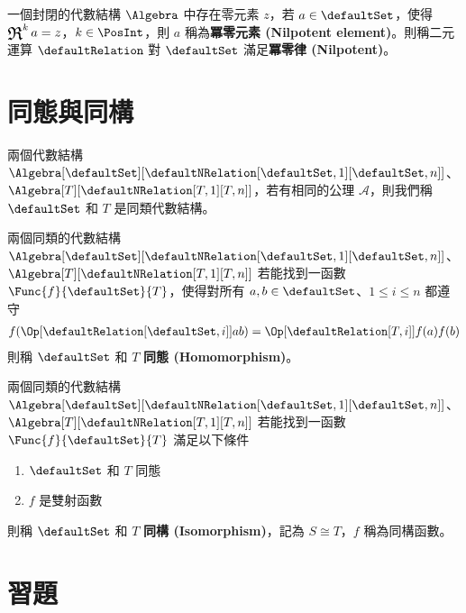 \documentclass[12pt,a4paper,oneside]{report}
\begin{document}
\begin{CJK}{UTF8}{bkai}
\begin{mydef}[冪零元素與冪零律]
\label{def:algebra:nilpotent}
一個封閉的代數結構 $\Algebra$ 中存在零元素 $z$，若 $a\in{\defaultSet}$，使得 $\opR^{k}{a}=z$，$k\in{\PosInt}$，則 $a$ 稱為\textbf{冪零元素 (Nilpotent element)}。則稱二元運算 $\defaultRelation$ 對 $\defaultSet$ 滿足\textbf{冪零律 (Nilpotent)}。
\end{mydef}

\section{同態與同構}

\begin{mydef}[代數結構分類]
兩個代數結構 $\Algebra[\defaultSet][{\defaultNRelation[\defaultSet,1][\defaultSet,n]}]$、$\Algebra[T][{\defaultNRelation[T,1][T,n]}]$，若有相同的公理 $\mathcal{A}$，則我們稱 $\defaultSet$ 和 $T$ 是同類代數結構。
\end{mydef}

\begin{mydef}[同態]
\label{def:algebra:homomorphism}
兩個同類的代數結構 $\Algebra[\defaultSet][{\defaultNRelation[\defaultSet,1][\defaultSet,n]}]$、$\Algebra[T][{\defaultNRelation[T,1][T,n]}]$ 若能找到一函數 $\Func{f}{\defaultSet}{T}$，使得對所有 $a,b\in{\defaultSet}$、$1\leq{i}\leq{n}$ 都遵守
\begin{align*}
{f(\Op[{\defaultRelation[\defaultSet,i]}]{a}{b})}=\Op[{\defaultRelation[T,i]}]{f(a)}{f(b)}
\end{align*}
則稱 $\defaultSet$ 和 $T$ \textbf{同態 (Homomorphism)}。
\end{mydef}

\begin{mydef}[同構]
\label{def:algebra:isomorphism}
兩個同類的代數結構 $\Algebra[\defaultSet][{\defaultNRelation[\defaultSet,1][\defaultSet,n]}]$、$\Algebra[T][{\defaultNRelation[T,1][T,n]}]$ 若能找到一函數 $\Func{f}{\defaultSet}{T}$ 滿足以下條件
\begin{enumerate}
\item $\defaultSet$ 和 $T$ 同態
\item $f$ 是雙射函數
\end{enumerate}
則稱 $\defaultSet$ 和 $T$ \textbf{同構 (Isomorphism)}，記為 $S\cong{T}$，$f$ 稱為同構函數。
\end{mydef}

\section*{習題}


\end{CJK}
\end{document}
